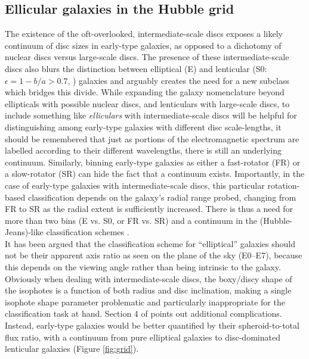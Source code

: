 \documentclass[useAMS,usenatbib,article]{mnras}
\begin{document}
  \subsection{Ellicular galaxies in the Hubble grid}
  The existence of the oft-overlooked, intermediate-scale discs
  exposes a likely continuum of disc sizes in early-type
  galaxies, as opposed to a dichotomy of nuclear discs versus large-scale
  discs. The presence of these intermediate-scale discs also blurs the
  distinction between elliptical (E) and lenticular (S0: $\epsilon = 1-b/a > 0.7$, \citealt{hubble1936,sandage1961}) galaxies and
  arguably creates the need for a new subclass which bridges this
  divide.  While expanding the galaxy nomenclature beyond ellipticals
  with possible nuclear discs, and lenticulars with large-scale discs,
  to include something like \emph{elliculars} with intermediate-scale
  discs will be helpful for distinguishing among 
  early-type galaxies with different disc scale-lengths, it should be
  remembered that just as portions of the electromagnetic spectrum are
  labelled according to their different wavelengths, there is still an
  underlying continuum.  Similarly, binning early-type galaxies as
  either a fast-rotator (FR) or a slow-rotator (SR) can hide the fact
  that a continuum exists.  Importantly, in the case of early-type
  galaxies with intermediate-scale discs, this particular
  rotation-based classification depends on the galaxy's radial range probed, 
  changing from FR to SR as the radial extent is sufficiently increased. 
  There is thus a need for more than two bins (E vs. S0, or FR vs. SR) 
  and a continuum in the (Hubble-Jeans)-like classification schemes \citep{vandenbergh1997,sandage2005}. \\
  It has been argued that the classification
  scheme for ``elliptical'' galaxies should not be their apparent axis ratio
  as seen on the plane of the sky (E0--E7), 
  because this depends on the viewing angle rather than being intrinsic to the galaxy. 
  Obviously when dealing with intermediate-scale discs, the boxy/discy shape of the isophotes is a function of both radius and disc inclination, 
  making a single isophote shape parameter problematic and particularly inappropriate for the classification task at hand.
  Section 4 of \cite{kormendybender1996} points out additional complications. 
  Instead, early-type galaxies would be better quantified by their spheroid-to-total flux ratio, with a
  continuum from pure elliptical galaxies to disc-dominated lenticular
  galaxies (Figure \ref{fig:grid}).  \\
\end{document}

